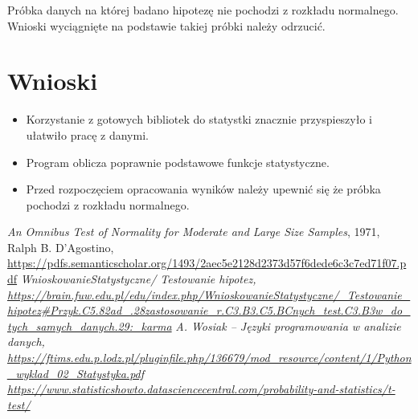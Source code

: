 \documentclass{classrep}
\begin{document}

Próbka danych na której badano hipotezę nie pochodzi z rozkładu normalnego. Wnioski wyciągnięte na podstawie takiej próbki należy odrzucić.


\section{Wnioski}
\begin{itemize}
    \item Korzystanie z gotowych bibliotek do statystki znacznie przyspieszyło i ułatwiło pracę z danymi.
    \item Program oblicza poprawnie podstawowe funkcje statystyczne.
    \item Przed rozpoczęciem opracowania wyników należy upewnić się że próbka pochodzi z rozkładu normalnego.
\end{itemize}

\begin{thebibliography}{0}
    \textsl{An Omnibus Test of Normality for Moderate and Large Size Samples}, 1971, Ralph B. D'Agostino, \url{https://pdfs.semanticscholar.org/1493/2aec5e2128d2373d57f6dede6c3c7ed71f07.pdf}
    \textsl{WnioskowanieStatystyczne/ Testowanie hipotez, \url{https://brain.fuw.edu.pl/edu/index.php/WnioskowanieStatystyczne/_Testowanie_hipotez\#Przyk.C5.82ad_.28zastosowanie_r.C3.B3.C5.BCnych_test.C3.B3w_do_tych_samych_danych.29:_karma}}
    \textsl{A. Wosiak – Języki programowania w analizie danych, \url{https://ftims.edu.p.lodz.pl/pluginfile.php/136679/mod_resource/content/1/Python_wyklad_02_Statystyka.pdf}}
    \textsl{\url{https://www.statisticshowto.datasciencecentral.com/probability-and-statistics/t-test/}}
\end{thebibliography}
\end{document}
